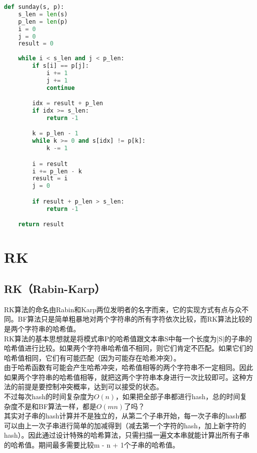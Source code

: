 \begin{lstlisting}[language=Python]
def sunday(s, p):
    s_len = len(s)
    p_len = len(p)
    i = 0
    j = 0
    result = 0
    
    while i < s_len and j < p_len:
        if s[i] == p[j]:
            i += 1
            j += 1
            continue

        idx = result + p_len
        if idx >= s_len:
            return -1

        k = p_len - 1
        while k >= 0 and s[idx] != p[k]:
            k -= 1

        i = result
        i += p_len - k
        result = i
        j = 0

        if result + p_len > s_len:
            return -1

    return result
\end{lstlisting}

\newpage

\section{RK}

\subsection{RK（Rabin-Karp）}

RK算法的命名由Rabin和Karp两位发明者的名字而来，它的实现方式有点与众不同。BF算法只是简单粗暴地对两个字符串的所有字符依次比较，而RK算法比较的是两个字符串的哈希值。 \\

RK算法的基本思想就是将模式串P的哈希值跟文本串S中每一个长度为|S|的子串的哈希值进行比较。如果两个字符串哈希值不相同，则它们肯定不匹配。如果它们的哈希值相同，它们有可能匹配（因为可能存在哈希冲突）。 \\

由于哈希函数有可能会产生哈希冲突，哈希值相等的两个字符串不一定相同。因此如果两个字符串的哈希值相等，就把这两个字符串本身进行一次比较即可。这种方法的前提是要控制冲突概率，达到可以接受的状态。 \\

不过每次hash的时间复杂度为$ O(n) $，如果把全部子串都进行hash，总的时间复杂度不是和BF算法一样，都是$ O(mn) $了吗？ \\

其实对子串的hash计算并不是独立的，从第二个子串开始，每一次子串的hash都可以由上一次子串进行简单的加减得到（减去第一个字符的hash，加上新字符的hash）。因此通过设计特殊的哈希算法，只需扫描一遍文本串就能计算出所有子串的哈希值。期间最多需要比较m - n + 1个子串的哈希值。 \\

